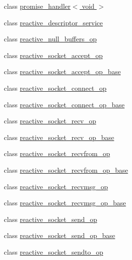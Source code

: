\begin{DoxyCompactItemize}
\item 
class \hyperlink{classasio_1_1detail_1_1promise__handler_3_01void_01_4}{promise\+\_\+handler$<$ void $>$}
\item 
class \hyperlink{classasio_1_1detail_1_1reactive__descriptor__service}{reactive\+\_\+descriptor\+\_\+service}
\item 
class \hyperlink{classasio_1_1detail_1_1reactive__null__buffers__op}{reactive\+\_\+null\+\_\+buffers\+\_\+op}
\item 
class \hyperlink{classasio_1_1detail_1_1reactive__socket__accept__op}{reactive\+\_\+socket\+\_\+accept\+\_\+op}
\item 
class \hyperlink{classasio_1_1detail_1_1reactive__socket__accept__op__base}{reactive\+\_\+socket\+\_\+accept\+\_\+op\+\_\+base}
\item 
class \hyperlink{classasio_1_1detail_1_1reactive__socket__connect__op}{reactive\+\_\+socket\+\_\+connect\+\_\+op}
\item 
class \hyperlink{classasio_1_1detail_1_1reactive__socket__connect__op__base}{reactive\+\_\+socket\+\_\+connect\+\_\+op\+\_\+base}
\item 
class \hyperlink{classasio_1_1detail_1_1reactive__socket__recv__op}{reactive\+\_\+socket\+\_\+recv\+\_\+op}
\item 
class \hyperlink{classasio_1_1detail_1_1reactive__socket__recv__op__base}{reactive\+\_\+socket\+\_\+recv\+\_\+op\+\_\+base}
\item 
class \hyperlink{classasio_1_1detail_1_1reactive__socket__recvfrom__op}{reactive\+\_\+socket\+\_\+recvfrom\+\_\+op}
\item 
class \hyperlink{classasio_1_1detail_1_1reactive__socket__recvfrom__op__base}{reactive\+\_\+socket\+\_\+recvfrom\+\_\+op\+\_\+base}
\item 
class \hyperlink{classasio_1_1detail_1_1reactive__socket__recvmsg__op}{reactive\+\_\+socket\+\_\+recvmsg\+\_\+op}
\item 
class \hyperlink{classasio_1_1detail_1_1reactive__socket__recvmsg__op__base}{reactive\+\_\+socket\+\_\+recvmsg\+\_\+op\+\_\+base}
\item 
class \hyperlink{classasio_1_1detail_1_1reactive__socket__send__op}{reactive\+\_\+socket\+\_\+send\+\_\+op}
\item 
class \hyperlink{classasio_1_1detail_1_1reactive__socket__send__op__base}{reactive\+\_\+socket\+\_\+send\+\_\+op\+\_\+base}
\item 
class \hyperlink{classasio_1_1detail_1_1reactive__socket__sendto__op}{reactive\+\_\+socket\+\_\+sendto\+\_\+op}

\end{DoxyCompactItemize}
